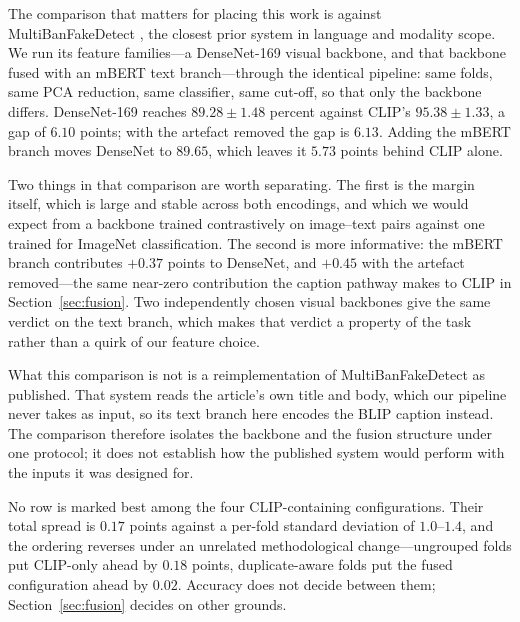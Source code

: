 The comparison that matters for placing this work is against
MultiBanFakeDetect \cite{multibanfake}, the closest prior system in language
and modality scope. We run its feature families---a DenseNet-169 visual
backbone, and that backbone fused with an mBERT text branch---through the
identical pipeline: same folds, same PCA reduction, same classifier, same
cut-off, so that only the backbone differs. DenseNet-169 reaches
$89.28 \pm 1.48$ percent against CLIP's $95.38 \pm 1.33$, a gap of $6.10$
points; with the artefact removed the gap is $6.13$. Adding the mBERT branch
moves DenseNet to $89.65$, which leaves it $5.73$ points behind CLIP alone.

Two things in that comparison are worth separating. The first is the margin
itself, which is large and stable across both encodings, and which we would
expect from a backbone trained contrastively on image--text pairs against one
trained for ImageNet classification. The second is more informative: the mBERT
branch contributes $+0.37$ points to DenseNet, and $+0.45$ with the artefact
removed---the same near-zero contribution the caption pathway makes to CLIP in
Section~\ref{sec:fusion}. Two independently chosen visual backbones give the
same verdict on the text branch, which makes that verdict a property of the
task rather than a quirk of our feature choice.

What this comparison is not is a reimplementation of MultiBanFakeDetect as
published. That system reads the article's own title and body, which our
pipeline never takes as input, so its text branch here encodes the BLIP caption
instead. The comparison therefore isolates the backbone and the fusion
structure under one protocol; it does not establish how the published system
would perform with the inputs it was designed for.

No row is marked best among the four CLIP-containing configurations. Their
total spread is $0.17$ points against a per-fold standard deviation of
$1.0$--$1.4$, and the ordering reverses under an unrelated methodological
change---ungrouped folds put CLIP-only ahead by $0.18$ points, duplicate-aware
folds put the fused configuration ahead by $0.02$. Accuracy does not decide
between them; Section~\ref{sec:fusion} decides on other grounds.

